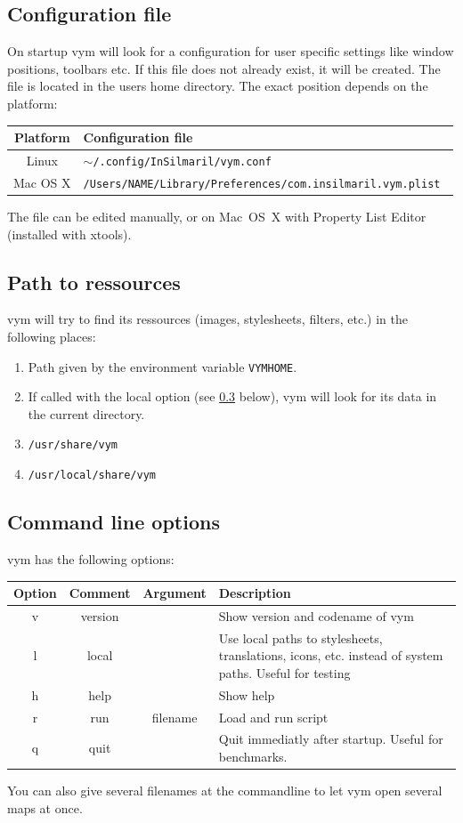 \documentclass[12pt,a4paper]{article}
\newcommand{\vym}{{\sc vym }}
\begin{document}
\begin{appendix}
\subsection{Configuration file}
On startup \vym will look for a configuration for user specific settings
like window positions, toolbars etc. If this file does not already
exist, it will be created. The file is located in the users home
directory. The exact position depends on the platform:
\begin{center}
\begin{tabular}{cl}
    {\bf Platform}  & {\bf Configuration file} \\ \hline
    Linux       & {\tt $\sim$/.config/InSilmaril/vym.conf  } \\
    Mac OS X    & {\tt /Users/NAME/Library/Preferences/com.insilmaril.vym.plist  } \\
\end{tabular}
\end{center}
The file can be edited manually, or on Mac~OS~X with Property List
Editor (installed with xtools).

\subsection{Path to ressources}
\vym will try to find its ressources (images, stylesheets, filters,
etc.) in the following places:
\begin{enumerate}
    \item Path given by the environment variable {\tt VYMHOME}.
    \item If called with the local option (see \ref{options} below),
          \vym will look for its data in the current directory.
    \item {\tt /usr/share/vym}
    \item {\tt /usr/local/share/vym}
\end{enumerate}

\subsection{Command line options} \label{options}
\vym has the following options:
\begin{center}
\begin{tabular}{cccp{8cm}}\\ 
\bf Option  & \bf Comment & \bf Argument & \bf Description \\ \hline
v & version &           & Show version and codename of \vym\\
l & local   &           & Use local paths to stylesheets, translations, icons, 
                          etc. instead of system paths. Useful for testing\\
h & help    &           & Show help\\
r & run     & filename  & Load and run script\\
q & quit    &           & Quit immediatly after startup. Useful for benchmarks.\\
\end{tabular}
\end{center}
You can also give several filenames at the commandline to let \vym open
several maps at once.
 


\end{appendix}
\end{document}
